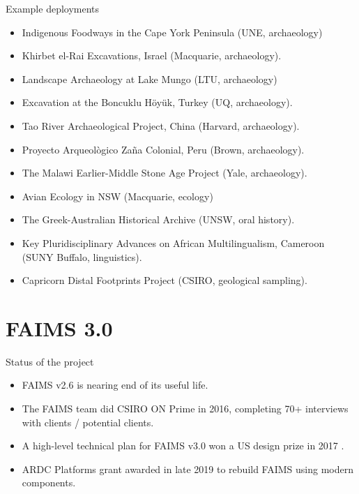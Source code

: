 \documentclass[aspectratio=169, 12pt]{beamer} %
\begin{document}
\begin{frame}{Example deployments}
 \begin{itemize}[label=\textbullet]
        \item Indigenous Foodways in the Cape York Peninsula (UNE, archaeology)
        \item Khirbet el-Rai Excavations, Israel (Macquarie, archaeology).
        \item Landscape Archaeology at Lake Mungo (LTU, archaeology)
        \item Excavation at the Boncuklu Höyük, Turkey (UQ, archaeology).
        \item Tao River Archaeological Project, China (Harvard, archaeology).
        \item Proyecto Arqueològico Zaña Colonial, Peru (Brown, archaeology).
        \item The Malawi Earlier-Middle Stone Age Project (Yale, archaeology).
        \item Avian Ecology in NSW (Macquarie, ecology)
        \item The Greek-Australian Historical Archive (UNSW, oral history).
        \item Key Pluridisciplinary Advances on African Multilingualism, Cameroon (SUNY Buffalo, linguistics).
        \item Capricorn Distal Footprints Project (CSIRO, geological sampling).

    \end{itemize}
\end{frame}

\section{FAIMS 3.0}

\begin{frame}{Status of the project}
    \begin{itemize}[label=\textbullet]
        \item FAIMS v2.6 is nearing end of its useful life.
        \item The FAIMS team did CSIRO ON Prime in 2016, completing 70+ interviews with clients / potential clients.
        \item A high-level technical plan for FAIMS v3.0 won a US design prize in 2017 \cite{Bureau_of_Reclamation2017-xl}.
        \item ARDC Platforms grant awarded in late 2019 to rebuild FAIMS using modern components.
    \end{itemize}
\end{frame}
\end{document}

